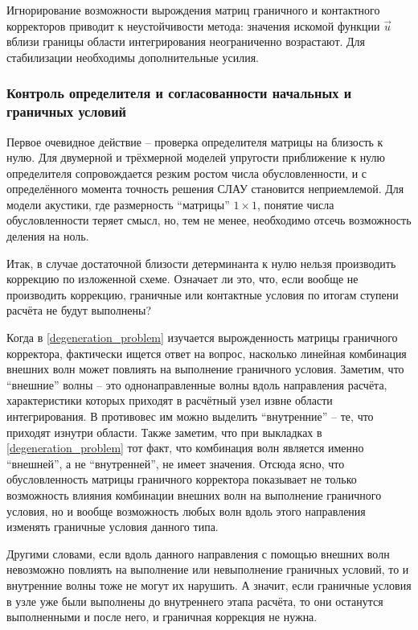 Игнорирование возможности вырождения матриц граничного и контактного 
корректоров приводит к неустойчивости метода: значения искомой функции 
$\vec{u}$ вблизи границы области интегрирования неограниченно возрастают. 
Для стабилизации необходимы дополнительные усилия.


\subsubsection{Контроль определителя и согласованности начальных и граничных условий}
Первое очевидное действие -- проверка определителя матрицы на близость к нулю. 
Для двумерной и трёхмерной моделей упругости приближение к нулю определителя 
сопровождается резким ростом числа обусловленности, и с определённого момента 
точность решения СЛАУ становится неприемлемой. Для модели акустики, где размерность 
``матрицы'' $1 \times 1$, понятие числа обусловленности теряет смысл, но,
тем не менее, необходимо отсечь возможность деления на ноль. 

Итак, в случае достаточной близости детерминанта к нулю нельзя производить 
коррекцию по изложенной схеме. Означает ли это, что, если вообще не производить коррекцию, 
граничные или контактные условия по итогам ступени расчёта не будут выполнены? 

Когда в \ref{degeneration_problem} изучается вырожденность матрицы 
граничного корректора, фактически ищется ответ на вопрос, насколько линейная 
комбинация внешних волн может повлиять на выполнение граничного условия. 
Заметим, что ``внешние'' волны -- это однонаправленные волны вдоль направления расчёта, 
характеристики которых приходят в расчётный узел извне области интегрирования. 
В противовес им можно выделить ``внутренние'' -- те, что приходят изнутри области.
Также заметим, что при выкладках в \ref{degeneration_problem} тот факт, что комбинация 
волн является именно ``внешней'', а не ``внутренней'', не имеет значения. 
Отсюда ясно, что обусловленность матрицы граничного корректора показывает не только 
возможность влияния комбинации внешних волн на выполнение граничного условия, но и 
вообще возможность любых волн вдоль этого направления изменять граничные условия данного типа. 

Другими словами, если вдоль данного направления 
с помощью внешних волн невозможно повлиять на выполнение или невыполнение 
граничных условий, то и внутренние волны тоже не могут их нарушить.
А значит, если граничные условия в узле уже были выполнены до внутреннего этапа расчёта, то 
они останутся выполненными и после него, и граничная коррекция не нужна.

